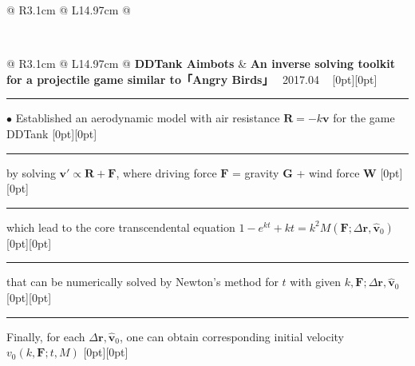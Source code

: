 {{\begin{tabularx}{\linewidth}{@{} R{3.1cm} @{\phantom{d}} L{14.97cm} @{}}
\end{tabularx}
\\
\begin{tabularx}{\linewidth}{@{} R{3.1cm} @{\phantom{d}} L{14.97cm} @{}}
	\textbf{DDTank Aimbots} & \hspace{10pt} \textbf{An inverse solving toolkit for a projectile game similar to「Angry Birds」} \hfill \textendash\ 2017.04 \newline \vspace{2pt} \ \hspace{-3pt} \raisebox{0.09\height}[0pt][0pt]{\vrule width0.5pt height30.0pt} \hspace{-0.26em}\rule[0.25em]{1.0em}{0.5pt}\!\! $\bullet$ {\small Established an aerodynamic model with air resistance $\boldsymbol{R} = - k \boldsymbol{v}$ for the game DDTank} \newline \vspace{-3pt} \hspace{12.5pt} \raisebox{0.18\height}[0pt][0pt]{\vrule width0.5pt height15.0pt} \hspace{-0.26em}\rule[0.25em]{1.0em}{0.5pt}\!\! \raisebox{0.2\height}{\scriptsize $\blacktriangleright$} {\small by solving $\boldsymbol{v}' \propto \boldsymbol{R} + \boldsymbol{F}$, where driving force $\boldsymbol{F}$ = gravity $\boldsymbol{G}$ + wind force $\boldsymbol{W}$} \newline \vspace{-3pt} \hspace{12.5pt} \raisebox{0.18\height}[0pt][0pt]{\vrule width0.5pt height15.0pt} \hspace{-0.26em}\rule[0.25em]{1.0em}{0.5pt}\!\! \raisebox{0.2\height}{\scriptsize $\blacktriangleright$} {\small which lead to the core transcendental equation $1-e^{k t}+k t = k^2 M(\boldsymbol{F};\Delta \boldsymbol{r},\hat{\boldsymbol{v}}_0)$} \newline \vspace{-3pt} \hspace{12.5pt} \raisebox{0.18\height}[0pt][0pt]{\vrule width0.5pt height15.0pt} \hspace{-0.26em}\rule[0.25em]{1.0em}{0.5pt}\!\! \raisebox{0.2\height}{\scriptsize $\blacktriangleright$} {\small that can be numerically solved by Newton's method for $t$ with given $k,\boldsymbol{F};\Delta \boldsymbol{r},\hat{\boldsymbol{v}}_0$} \newline \vspace{-3pt} \hspace{12.5pt} \raisebox{0.18\height}[0pt][0pt]{\vrule width0.5pt height15.0pt} \hspace{-0.26em}\rule[0.25em]{1.0em}{0.5pt}\!\! \raisebox{0.2\height}{\scriptsize $\blacktriangleright$} {\small Finally, for each $\Delta \boldsymbol{r},\hat{\boldsymbol{v}}_0$, one can obtain corresponding initial velocity $v_0\left(k,\boldsymbol{F};t,M\right)$} \newline \vspace{-3pt} \hspace{25.3pt} \raisebox{0.18\height}[0pt][0pt]{\vrule width0.5pt height15.0pt} 
\end{tabularx}}}
